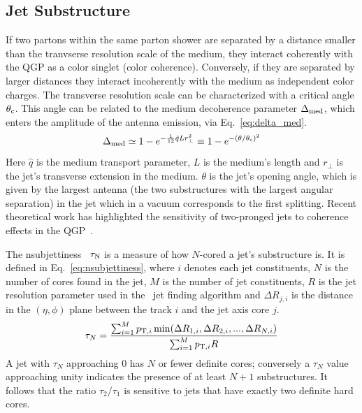 \documentclass[10pt]{article}
\begin{document}
\subsection{Jet Substructure}
If two partons within the same parton shower are separated by a distance smaller than the tranvserse resolution scale of the medium, they interact coherently with the QGP as a color singlet (color coherence). 
Conversely, if they are separated by larger distances they interact incoherently with the medium as independent color charges.
The transverse resolution scale can be characterized with a critical angle $\theta_{\rm c}$. This angle can be related to the medium decoherence parameter $\Delta_{\rm med}$, which enters the amplitude of the antenna emission, via Eq.~\ref{eq:delta_med}\cite{Mehtar-Tani:2012, Casalderrey-Solana:2013}.
\begin{equation}
\Delta_{\rm med} \simeq 1 - e^{-\frac{1}{12}\hat{q}Lr^2_{\bot}} \equiv 1 - e^{-(\theta/\theta_{\rm c})^2}
\label{eq:delta_med}
\end{equation}
Here $\hat{q}$ is the medium transport parameter, $L$ is the medium's
length and $r_{\bot}$ is the jet's transverse extension in the medium. $\theta$ is the jet's opening angle, which is given by
the largest antenna (the two substructures with the largest angular separation) in the jet which in a vacuum
corresponds to the first splitting. Recent theoretical work has highlighted the sensitivity of two-pronged jets
to coherence effects in the QGP~\cite{}.

The nsubjettiness~\cite{} $\tau_{\rm N}$ is a measure of how $N$-cored a jet's substructure is. It is defined in Eq.~\ref{eq:nsubjettiness}, where
$i$ denotes each jet constituents, $N$ is the number of cores found in the jet, $M$ is the number of jet constituents, $R$ is the jet resolution parameter used in the \kt\ jet finding algorithm
and $\Delta R_{j,i}$ is the distance in the $(\eta,\phi)$ plane between the track $i$ and the jet axis core $j$.
\begin{equation}
\tau_N = \frac{\sum^M_{i=1}p_{{\rm T},i}\min(\Delta R_{1,i},\Delta R_{2,i},...,\Delta R_{N,i})}{\sum^M_{i=1}p_{{\rm T},i}R}
\label{eq:nsubjettiness}
\end{equation}
A jet with $\tau_N$ approaching $0$ 
has $N$ or fewer definite cores; conversely a $\tau_N$ value
approaching unity indicates the presence of at least $N + 1$ substructures. 
It follows that the ratio $\tau_2/\tau_1$ is sensitive to jets that have exactly two definite hard cores. 
\end{document}
